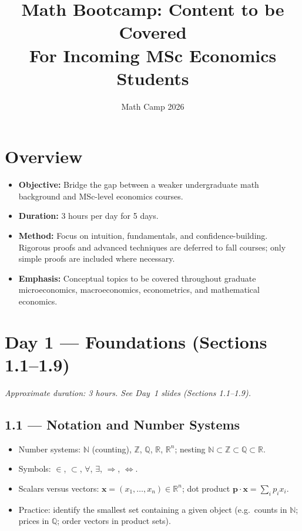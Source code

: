 \documentclass[11pt,a4paper]{article}
\title{\textbf{Math Bootcamp: Content to be Covered}\\[0.4em]
\large For Incoming MSc Economics Students}
\author{Math Camp 2026}
\date{}
\begin{document}
\maketitle

\section*{Overview}

\begin{itemize}[leftmargin=*]
    \item \textbf{Objective:} Bridge the gap between a weaker undergraduate math background and MSc-level economics courses.
    \item \textbf{Duration:} 3 hours per day for 5 days.
    \item \textbf{Method:} Focus on intuition, fundamentals, and confidence-building. Rigorous proofs and advanced techniques are deferred to fall courses; only simple proofs are included where necessary.
    \item \textbf{Emphasis:} Conceptual topics to be covered throughout graduate microeconomics, macroeconomics, econometrics, and mathematical economics.
\end{itemize}

\tableofcontents
\newpage

\section{Day 1 --- Foundations (Sections 1.1--1.9)}

\textit{Approximate duration: 3 hours. See Day~1 slides (Sections 1.1--1.9).}

\subsection{1.1 --- Notation and Number Systems}
\begin{itemize}[leftmargin=*]
    \item Number systems: $\mathbb{N}$ (counting), $\mathbb{Z}$, $\mathbb{Q}$, $\mathbb{R}$, $\mathbb{R}^n$;
      nesting $\mathbb{N}\subset\mathbb{Z}\subset\mathbb{Q}\subset\mathbb{R}$.
    \item Symbols: $\in$, $\subset$, $\forall$, $\exists$, $\Rightarrow$, $\Leftrightarrow$.
    \item Scalars versus vectors: $\mathbf{x}=(x_1,\ldots,x_n)\in\mathbb{R}^n$;
      dot product $\mathbf{p}\cdot\mathbf{x}=\sum_i p_i x_i$.
    \item Practice: identify the smallest set containing a given object
      (e.g.\ counts in $\mathbb{N}$; prices in $\mathbb{Q}$; order vectors in product sets).
\end{itemize}
\end{document}
